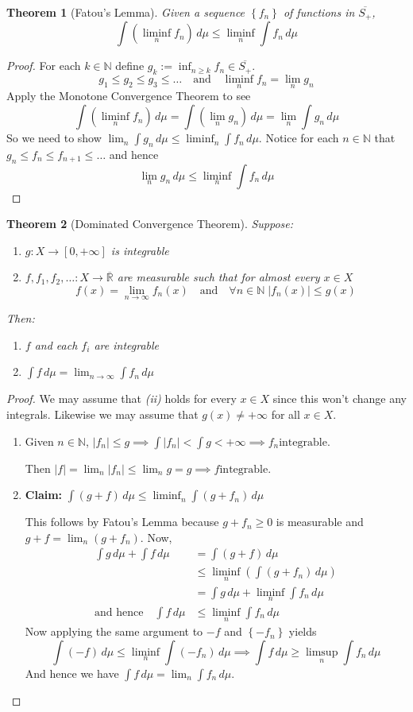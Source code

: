 \documentclass[11pt]{article}
\newcommand{\defeq}{:=}
\newcommand{\abs}[1]{|#1|}
\newcommand{\dm}{\ensuremath{\,d\mu}}
\newcommand{\R}{\mathbb{R}}
\newcommand{\Rb}{\overline{\R}}
\newcommand{\N}{\mathbb{N}}
\newtheorem{theorem}{Theorem}[section]
\begin{document}
\begin{theorem}[Fatou's Lemma]
Given a sequence $\left\{f_n\right\}$ of functions in $\overline{S_+}$,
\[
	\int \left(\liminf_n f_n\right)\dm \leq \liminf_n \int f_n \dm
\]
\end{theorem}
\begin{proof}
For each $k\in\N$ define $g_k\defeq\inf_{n\geq k} f_n \in \overline{S_+}$.
\[
	g_1 \leq g_2 \leq g_3 \leq \dots \quad \text{and} \quad \liminf_n f_n = \lim_n g_n
\]
Apply the Monotone Convergence Theorem to see
\[
	\int \left(\liminf_n f_n \right)\dm = \int \left(\lim_n g_n\right)\dm = \lim_n \int g_n \dm
\]
So we need to show $\lim_n\int g_n \dm \leq \liminf_n \int f_n \dm$.
Notice for each $n\in\N$ that $g_n\leq f_n \leq f_{n+1} \leq \dots$ and hence
\[
\lim_n g_n \dm \leq \liminf_n \int f_n \dm
\]
\end{proof}
\begin{theorem}[Dominated Convergence Theorem]
Suppose:
\begin{enumerate}[label=(\roman*)]
	\item $g:X\to [0, +\infty]$ is integrable
	\item $f,f_1,f_2, \dots:X\to\Rb$ are measurable such that for almost every $x\in X$
		\[
			f(x) = \lim_{n\to\infty}f_n(x)\quad\text{and}\quad\forall n\in\N \;\abs{f_n(x)}\leq g(x)
		\]
\end{enumerate}
Then:
\begin{enumerate}
	\item $f$ and each $f_i$ are integrable
	\item $\int f \dm = \lim_{n\to\infty}\int f_n \dm$
\end{enumerate}
\end{theorem}
\begin{proof}
We may assume that \textit{(ii)} holds for every $x\in X$ since this won't change any integrals.
Likewise we may assume that $g(x)\neq + \infty$ for all $x\in X$.
\begin{enumerate}
	\item Given $n\in\N$, $\abs{f_n}\leq g\implies \int \abs{f_n} < \int g < + \infty \implies f_n \text{integrable}$.

		Then $\abs{f}=\lim_n\abs{f_n}\leq \lim_n g = g\implies f\text{integrable}$.
	\item \textbf{Claim: }$\int\left(g+f\right)\dm\leq\liminf_n\int\left(g+f_n\right)\dm$
		
		This follows by Fatou's Lemma because $g+f_n\geq 0$ is measurable and $g+f=\lim_n\left(g+f_n\right)$.
		Now,
		\begin{align*}
			\int g \dm + \int f \dm &= \int (g+f)\dm \\
									&\leq \liminf_n \left(\int \left(g+ f_n\right)\dm\right) \\
									&= \int g \dm + \liminf_n \int f_n \dm \\
			\text{and hence}\quad \int f \dm &\leq \liminf_n \int f_n \dm
		\end{align*}
		Now applying the same argument to $-f$ and $\left\{-f_n\right\}$ yields
		\[
			\int(-f)\dm \leq \liminf_n\int(-f_n)\dm \implies \int f \dm \geq \limsup_n \int f_n \dm
		\]
		And hence we have $\int f \dm = \lim_n \int f_n \dm$.
\end{enumerate}
\end{proof}
\end{document}
